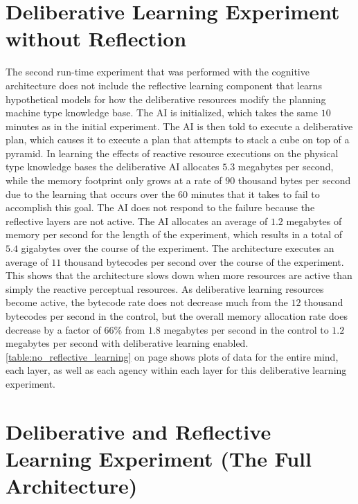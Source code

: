 \section{Deliberative Learning Experiment without Reflection}

The second run-time experiment that was performed with the cognitive
architecture does not include the reflective learning component that
learns hypothetical models for how the deliberative resources modify
the planning machine type knowledge base.  The AI is initialized,
which takes the same $10$ minutes as in the initial experiment.  The
AI is then told to execute a deliberative plan, which causes it to
execute a plan that attempts to stack a cube on top of a pyramid.  In
learning the effects of reactive resource executions on the physical
type knowledge bases the deliberative AI allocates $5.3$ megabytes per
second, while the memory footprint only grows at a rate of $90$
thousand bytes per second due to the learning that occurs over the
$60$ minutes that it takes to fail to accomplish this goal.  The AI
does not respond to the failure because the reflective layers are not
active.  The AI allocates an average of $1.2$ megabytes of memory per
second for the length of the experiment, which results in a total of
$5.4$ gigabytes over the course of the experiment.  The architecture
executes an average of $11$ thousand bytecodes per second over the
course of the experiment.  This shows that the architecture slows down
when more resources are active than simply the reactive perceptual
resources.  As deliberative learning resources become active, the
bytecode rate does not decrease much from the $12$ thousand bytecodes
per second in the control, but the overall memory allocation rate does
decrease by a factor of $66$\% from $1.8$ megabytes per second in the
control to $1.2$ megabytes per second with deliberative learning
enabled.  \autoref{table:no_reflective_learning} on page
\pageref{table:no_reflective_learning} shows plots of data for the
entire mind, each layer, as well as each agency within each layer for
this deliberative learning experiment.

\section{Deliberative and Reflective Learning Experiment (The Full Architecture)}

